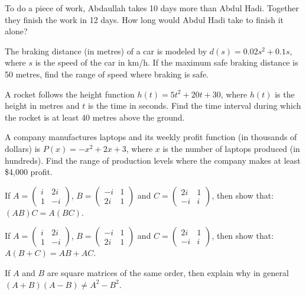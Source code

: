 \documentclass[11pt,a4paper]{article}
\begin{document}
\begin{longlist}
\item To do a piece of work, Abdaullah takes 10 days more than Abdul Hadi. Together they finish the work in 12 days. How long would Abdul Hadi take to finish it alone?

\item The braking distance (in metres) of a car is modeled by $d(s)=0.02s^2+0.1s$, where $s$ is the speed of the car in km/h. If the maximum safe braking distance is 50 metres, find the range of speed where braking is safe.

\item A rocket follows the height function $h(t)=5t^2+20t+30$, where $h(t)$ is the height in metres and $t$ is the time in seconds. Find the time interval during which the rocket is at least 40 metres above the ground.

\item A company manufactures laptops and its weekly profit function (in thousands of dollars) is $P(x)=-x^2+2x+3$, where $x$ is the number of laptops produced (in hundreds). Find the range of production levels where the company makes at least \$4{,}000 profit.

\item If $A=\begin{pmatrix}i & 2i\\ 1 & -i\end{pmatrix}$, $B=\begin{pmatrix}-i & 1\\ 2i & 1\end{pmatrix}$ and $C=\begin{pmatrix}2i & 1\\ -i & i\end{pmatrix}$, then show that: $(AB)C=A(BC)$.

\item If $A=\begin{pmatrix}i & 2i\\ 1 & -i\end{pmatrix}$, $B=\begin{pmatrix}-i & 1\\ 2i & 1\end{pmatrix}$ and $C=\begin{pmatrix}2i & 1\\ -i & i\end{pmatrix}$, then show that: $A(B+C)=AB+AC$.

\item If $A$ and $B$ are square matrices of the same order, then explain why in general $(A+B)(A-B)\neq A^2-B^2$.


\end{longlist}
\end{document}
